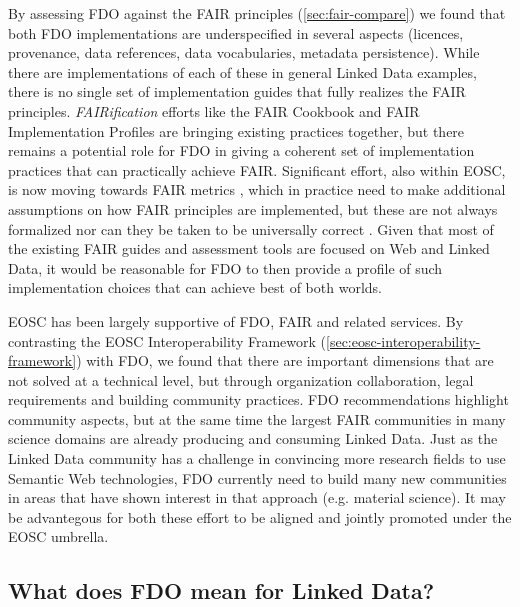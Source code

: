 \documentclass[fleqn,10pt,NOlineno]{wlpeerjlua}
\begin{document}
By assessing FDO against the FAIR principles (\vref*{sec:fair-compare}) we found that both FDO implementations are underspecified in several aspects (licences, provenance, data references, data vocabularies, metadata persistence). While there are implementations of each of these in general Linked Data examples, there is no single set of implementation guides that fully realizes the FAIR principles. \emph{FAIRification} efforts like the FAIR Cookbook \autocite{faircookbook} and FAIR Implementation Profiles \autocite{FIP} are bringing existing practices together, but there remains a potential role for FDO in giving a coherent set of implementation practices that can practically achieve FAIR. Significant effort, also within EOSC, is now moving towards FAIR metrics \autocite{Devaraju_2021}, which in practice need to make additional assumptions on how FAIR principles are implemented, but these are not always formalized \autocite{10.5281/zenodo.7463421} nor can they be taken to be universally correct \autocite{10.5281/zenodo.7848102}. Given that most of the existing FAIR guides and assessment tools are focused on Web and Linked Data, it would be reasonable for FDO to then provide a profile of such implementation choices that can achieve best of both worlds.

EOSC has been largely supportive of FDO, FAIR and related services. By contrasting the EOSC Interoperability Framework (\vref*{sec:eosc-interoperability-framework}) with FDO, we found that there are important dimensions that are not solved at a technical level, but through organization collaboration, legal requirements and building community practices. FDO recommendations highlight community aspects, but at the same time the largest FAIR communities in many science domains are already producing and consuming Linked Data. Just as the Linked Data community has a challenge in convincing more research fields to use Semantic Web technologies, FDO currently need to build many new communities in areas that have shown interest in that approach (e.g. material science).  It may be advantegous for both these effort to be aligned and jointly promoted under the EOSC umbrella. 




\subsection*{What does FDO mean for Linked Data?}\label{sec:what-does-it-mean-for-linked-data}
\end{document}
